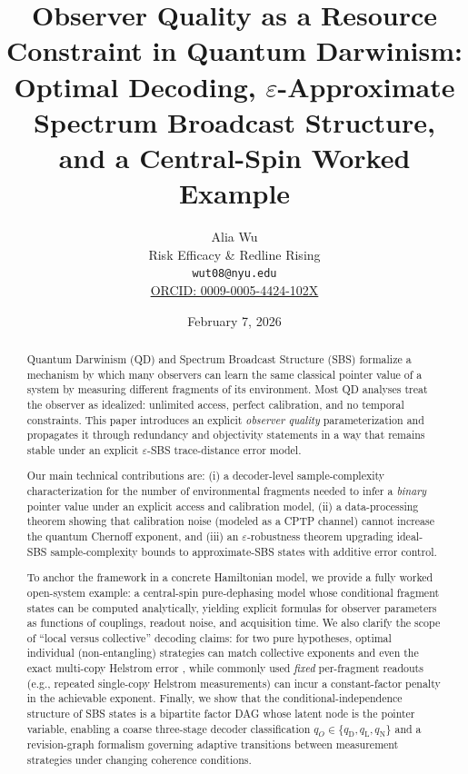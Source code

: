 \documentclass[11pt]{article}
\title{\bf Observer Quality as a Resource Constraint in Quantum Darwinism:\\
Optimal Decoding, $\varepsilon$-Approximate Spectrum Broadcast Structure,\\
and a Central-Spin Worked Example}
\author{
Alia Wu\\
Risk Efficacy \& Redline Rising\\
\texttt{wut08@nyu.edu}\\
\href{https://orcid.org/0009-0005-4424-102X}{ORCID: 0009-0005-4424-102X}
}
\date{February 7, 2026}
\newcommand{\1}{\mathbf{1}}
\theoremstyle{definition}
\theoremstyle{plain}
\begin{document}
\maketitle

\begin{abstract}
Quantum Darwinism (QD) and Spectrum Broadcast Structure (SBS) formalize a mechanism by which many observers can learn the same classical pointer value of a system by measuring different fragments of its environment.
Most QD analyses treat the observer as idealized: unlimited access, perfect calibration, and no temporal constraints.
This paper introduces an explicit \emph{observer quality} parameterization and propagates it through redundancy and objectivity statements in a way that remains stable under an explicit $\varepsilon$-SBS trace-distance error model.

Our main technical contributions are:
(i) a decoder-level sample-complexity characterization for the number of environmental fragments needed to infer a \emph{binary} pointer value under an explicit access and calibration model,
(ii) a data-processing theorem showing that calibration noise (modeled as a CPTP channel) cannot increase the quantum Chernoff exponent, and
(iii) an $\varepsilon$-robustness theorem upgrading ideal-SBS sample-complexity bounds to approximate-SBS states with additive error control.

To anchor the framework in a concrete Hamiltonian model, we provide a fully worked open-system example: a central-spin pure-dephasing model whose conditional fragment states can be computed analytically, yielding explicit formulas for observer parameters as functions of couplings, readout noise, and acquisition time.
We also clarify the scope of ``local versus collective'' decoding claims:
for two pure hypotheses, optimal individual (non-entangling) strategies can match collective exponents and even the exact multi-copy Helstrom error \citep{AcinBaganBaigMasanesMunozTapia2005}, while commonly used \emph{fixed} per-fragment readouts (e.g., repeated single-copy Helstrom measurements) can incur a constant-factor penalty in the achievable exponent.
Finally, we show that the conditional-independence structure of SBS states is a bipartite factor DAG whose latent node is the pointer variable, enabling a coarse three-stage decoder classification $q_O\in\{q_{\mathrm{D}},q_{\mathrm{L}},q_{\mathrm{N}}\}$ and a revision-graph formalism governing adaptive transitions between measurement strategies under changing coherence conditions.
\end{abstract}
\end{document}
